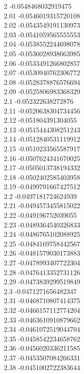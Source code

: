 {2	-0.0548468032919475\\
2.01	-0.0546019315720108\\
2.02	-0.0543549191130973\\
2.03	-0.0541059565555553\\
2.04	-0.0538552244698078\\
2.05	-0.0536028938663985\\
2.06	-0.0533491266802857\\
2.07	-0.0530940762306772\\
2.08	-0.0528378876576694\\
2.09	-0.0525806983368329\\
2.1	-0.052322638272876\\
2.11	-0.0520638304734456\\
2.12	-0.051804391304055\\
2.13	-0.0515444308251243\\
2.14	-0.0512840531119912\\
2.15	-0.0510233565587917\\
2.16	-0.0507624341670025\\
2.17	-0.0505013738194332\\
2.18	-0.0502402585403958\\
2.19	-0.0499791667427512\\
2.2	-0.0497181724624939\\
2.21	-0.0494573455815022\\
2.22	-0.049196752039055\\
2.23	-0.0489364540326833\\
2.24	-0.0486765102088925\\
2.25	-0.0484169758442567\\
2.26	-0.0481579030173883\\
2.27	-0.0478993407722304\\
2.28	-0.0476413352731126\\
2.29	-0.0473839299519849\\
2.3	-0.0471271656482347\\
2.31	-0.0468710807414375\\
2.32	-0.0466157112774204\\
2.33	-0.0463610910879662\\
2.34	-0.0461072519044704\\
2.35	-0.0458542234658762\\
2.36	-0.0456020336211585\\
2.37	-0.0453507084266331\\
2.38	-0.0451002722383644\\
}
